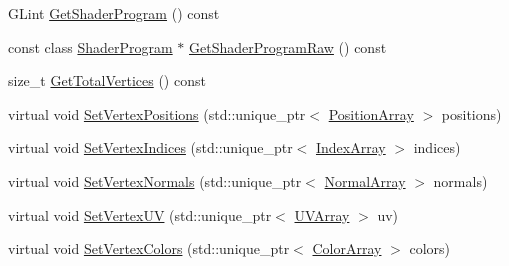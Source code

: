 \begin{DoxyCompactItemize}
\item 
G\+Lint \hyperlink{class_rendering_object_a80658debd2668b55a3c9fe86ec9f49fb}{Get\+Shader\+Program} () const 
\item 
const class \hyperlink{class_shader_program}{Shader\+Program} $\ast$ \hyperlink{class_rendering_object_ac9187166c98131aab185111e105528c2}{Get\+Shader\+Program\+Raw} () const 
\item 
size\+\_\+t \hyperlink{class_rendering_object_a3bb36683836c8c177984aa928cb1fb04}{Get\+Total\+Vertices} () const 
\item 
virtual void \hyperlink{class_rendering_object_ada51886b7da1924a17d3a55e8fe90061}{Set\+Vertex\+Positions} (std\+::unique\+\_\+ptr$<$ \hyperlink{class_rendering_object_a1223b9cf03f2029b9c43d71042c2a18e}{Position\+Array} $>$ positions)
\item 
virtual void \hyperlink{class_rendering_object_a61ea597df0c456834eac8eb4087fb573}{Set\+Vertex\+Indices} (std\+::unique\+\_\+ptr$<$ \hyperlink{class_rendering_object_a9931c88bca3384065c6691dfe1e60af1}{Index\+Array} $>$ indices)
\item 
virtual void \hyperlink{class_rendering_object_a4cd085aed01fbc5e4fae7076e00919d3}{Set\+Vertex\+Normals} (std\+::unique\+\_\+ptr$<$ \hyperlink{class_rendering_object_a327c4d892de8d6138fb59afa6d078257}{Normal\+Array} $>$ normals)
\item 
virtual void \hyperlink{class_rendering_object_a2a2b3c6ec2d13e8d3a4b6ac4c05ae11b}{Set\+Vertex\+U\+V} (std\+::unique\+\_\+ptr$<$ \hyperlink{class_rendering_object_a504ecd45ebe36dfa5b78c46d64d9904a}{U\+V\+Array} $>$ uv)
\item 
virtual void \hyperlink{class_rendering_object_aa1170c47ff02b2305a54c8aab3460201}{Set\+Vertex\+Colors} (std\+::unique\+\_\+ptr$<$ \hyperlink{class_rendering_object_a8a12e1f9be788d99af6c089e1c600022}{Color\+Array} $>$ colors)
\end{DoxyCompactItemize}
